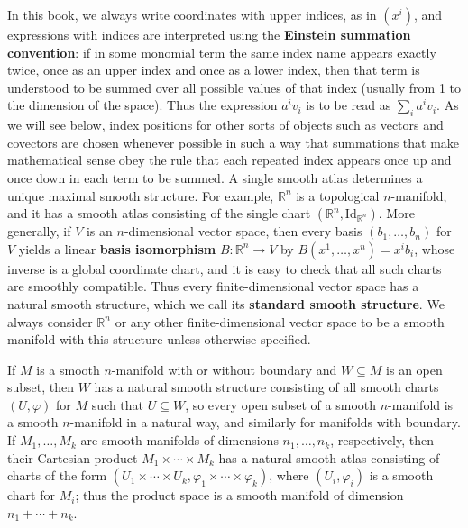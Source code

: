 In this book, we always write coordinates with upper indices, as in $(x^i)$, and expressions with indices are interpreted using the \textbf{Einstein summation convention}: if in some monomial term the same index name appears exactly twice, once as an upper index and once as a lower index, then that term is understood to be summed over all possible values of that index (usually from 1 to the dimension of the space). Thus the expression $a^i v_i$ is to be read as $\sum_i a^i v_i$. As we will see below, index positions for other sorts of objects such as vectors and covectors are chosen whenever possible in such a way that summations that make mathematical sense obey the rule that each repeated index appears once up and once down in each term to be summed. A single smooth atlas determines a unique maximal smooth structure. For example, $\mathbb{R}^n$ is a topological $n$-manifold, and it has a smooth atlas consisting of the single chart $(\mathbb{R}^n, \mathrm{Id}_{\mathbb{R}^n})$. More generally, if $V$ is an $n$-dimensional vector space, then every basis $(b_1, \ldots, b_n)$ for $V$ yields a linear \textbf{basis isomorphism} $B: \mathbb{R}^n \to V$ by $B(x^1, \ldots, x^n) = x^i b_i$, whose inverse is a global coordinate chart, and it is easy to check that all such charts are smoothly compatible. Thus every finite-dimensional vector space has a natural smooth structure, which we call its \textbf{standard smooth structure}. We always consider $\mathbb{R}^n$ or any other finite-dimensional vector space to be a smooth manifold with this structure unless otherwise specified.

If $M$ is a smooth $n$-manifold with or without boundary and $W \subseteq M$ is an open subset, then $W$ has a natural smooth structure consisting of all smooth charts $(U, \varphi)$ for $M$ such that $U \subseteq W$, so every open subset of a smooth $n$-manifold is a smooth $n$-manifold in a natural way, and similarly for manifolds with boundary. If $M_1, \ldots, M_k$ are smooth manifolds of dimensions $n_1, \ldots, n_k$, respectively, then their Cartesian product $M_1 \times \cdots \times M_k$ has a natural smooth atlas consisting of charts of the form $(U_1 \times \cdots \times U_k, \varphi_1 \times \cdots \times \varphi_k)$, where $(U_i, \varphi_i)$ is a smooth chart for $M_i$; thus the product space is a smooth manifold of dimension $n_1 + \cdots + n_k$.

